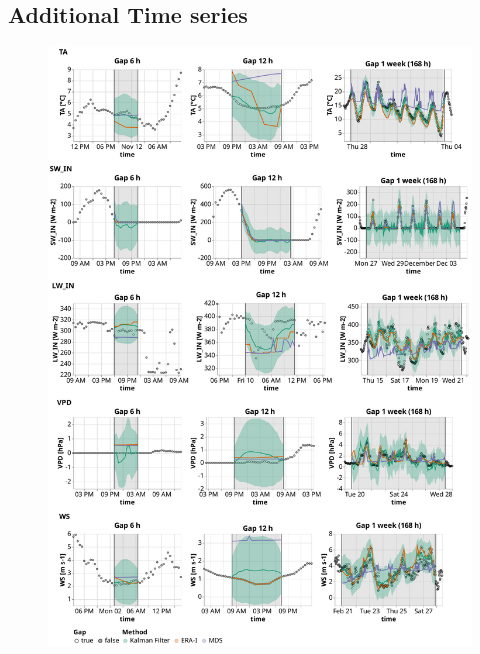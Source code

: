 \documentclass{article}
\newcommand{\imgwidth}{6in}
\let\Oldsubsection\subsection
\renewcommand{\subsection}{\FloatBarrier\Oldsubsection}
\begin{document}
\newcommand{\CapTheTableStand}{Imputation performance of the Kalman filter in comparison to the state-of-the-art
methods: ERA-Interim (ERA-I) and Marginal Distribution Sampling (MDS), using mean and standard deviation of the \textit{Root Mean Square Error} (RMSE). The best method for each gap length is highlighted in bold.}

\subsection{Additional Time series}

\begin{figure}
\centerline{\includegraphics[width=\imgwidth]{timeseries_1_1}}
\caption{}
\label{fig:ts_2-1}
\end{figure}
\end{document}
